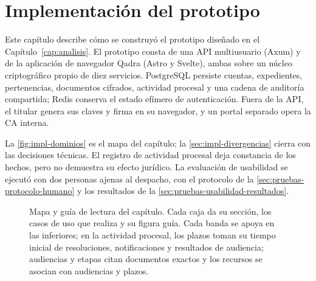 
\chapter{Implementación del prototipo}\label{cap:implementacion}

Este capítulo describe cómo se construyó el prototipo diseñado en el Capítulo~\ref{cap:analisis}. El prototipo consta de una API multiusuario (Axum) y de la aplicación de navegador Qadra (Astro y Svelte), ambas sobre un núcleo criptográfico propio de diez servicios. PostgreSQL persiste cuentas, expedientes, pertenencias, documentos cifrados, actividad procesal y una cadena de auditoría compartida; Redis conserva el estado efímero de autenticación. Fuera de la API, el titular genera sus claves y firma en su navegador, y un portal separado opera la CA interna.

La \cref{fig:impl-dominios} es el mapa del capítulo; la \cref{sec:impl-divergencias} cierra con las decisiones técnicas. El registro de actividad procesal deja constancia de los hechos, pero no demuestra su efecto jurídico. La evaluación de usabilidad se ejecutó con dos personas ajenas al despacho, con el protocolo de la \cref{sec:pruebas-protocolo-humano} y los resultados de la \cref{sec:pruebas-usabilidad-resultados}.

\begin{figure}[!htbp]
  \centering
  
  \caption{Mapa y guía de lectura del capítulo. Cada caja da su sección, los casos de uso que realiza y su figura guía. Cada banda se apoya en las inferiores; en la actividad procesal, los plazos toman su tiempo inicial de resoluciones, notificaciones y resultados de audiencia; audiencias y etapas citan documentos exactos y los recursos se asocian con audiencias y plazos.}
  \label{fig:impl-dominios}\label{tab:impl-guia}
\end{figure}































